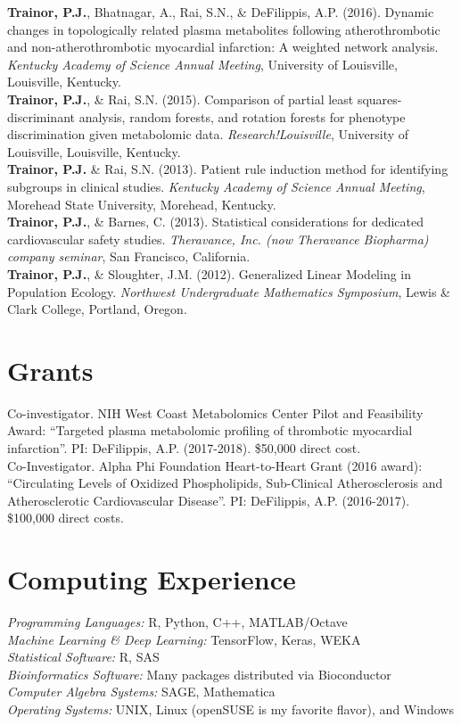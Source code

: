 \begin{DoubleSpace*}
{\textbf{Trainor, P.J.}, Bhatnagar, A., Rai, S.N., \& DeFilippis, A.P. (2016). Dynamic changes in topologically related plasma metabolites following atherothrombotic and non-atherothrombotic myocardial infarction: A weighted network analysis. \emph{Kentucky Academy of Science Annual Meeting}, University of Louisville, Louisville, Kentucky.  \\ 

\textbf{Trainor, P.J.}, \& Rai, S.N. (2015). Comparison of partial least squares-discriminant analysis, random forests, and rotation forests for phenotype discrimination given metabolomic data. \emph{Research!Louisville}, University of Louisville, Louisville, Kentucky.  \\ 

\textbf{Trainor, P.J.} \& Rai, S.N. (2013). Patient rule induction method for identifying subgroups in clinical studies. \emph{Kentucky Academy of Science Annual Meeting}, Morehead State University, Morehead, Kentucky. \\ 

\textbf{Trainor, P.J.}, \& Barnes, C. (2013). Statistical considerations for dedicated cardiovascular safety studies. \emph{Theravance, Inc. (now Theravance Biopharma) company seminar}, San Francisco, California. \\ 

\textbf{Trainor, P.J.}, \& Sloughter, J.M. (2012). Generalized Linear Modeling in Population Ecology. \emph{Northwest Undergraduate Mathematics Symposium}, Lewis \& Clark College, Portland, Oregon. 

\section*{Grants}
 Co-investigator. NIH West Coast Metabolomics Center Pilot and Feasibility Award: ``Targeted plasma metabolomic profiling of thrombotic myocardial infarction''. PI: DeFilippis, A.P. (2017-2018). \$50,000 direct cost. \\

 Co-Investigator. Alpha Phi Foundation Heart-to-Heart Grant (2016 award): ``Circulating Levels of Oxidized Phospholipids, Sub-Clinical Atherosclerosis and Atherosclerotic Cardiovascular Disease''. PI: DeFilippis, A.P. (2016-2017). \$100,000 direct costs. 

\section*{Computing Experience} 
\emph{Programming Languages:} R, Python, C++, MATLAB/Octave \\
\emph{Machine Learning \& Deep Learning:} TensorFlow, Keras, WEKA \\
\emph{Statistical Software:} R, SAS \\
\emph{Bioinformatics Software:} Many packages distributed via Bioconductor \\
\emph{Computer Algebra Systems:} SAGE, Mathematica \\ 
\emph{Operating Systems:} UNIX, Linux (openSUSE is my favorite flavor), and Windows

}
\end{DoubleSpace*}
